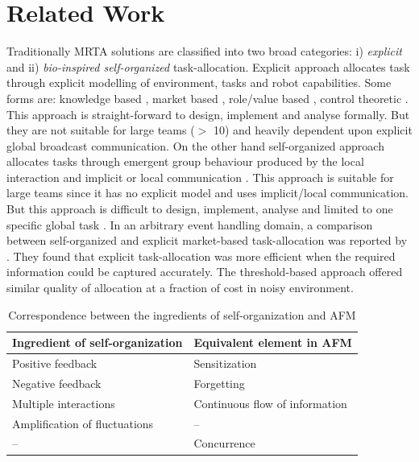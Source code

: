 \documentclass[smallcondensed]{svjour3}
\begin{document}
\section{Related Work}
\label{sec:rw}
Traditionally MRTA solutions are classified into two broad categories: i) {\em explicit} and ii) {\em bio-inspired self-organized} task-allocation.  Explicit approach allocates task through explicit modelling of environment, tasks and robot capabilities. Some forms are: knowledge based \citep{Parker1998}, market based \citep{Dias+2006}, role/value based \citep{Chaimowicz2002}, control theoretic \citep{Belta+2004}. This approach is straight-forward to design, implement and analyse formally. But they are not suitable for large teams ($>$ 10)  and heavily dependent upon explicit global broadcast communication.  On the other hand self-organized approach allocates tasks through emergent group behaviour produced by the local interaction and implicit or local communication \citep{Bonabeau+1999}. This approach is suitable for large teams since it has no explicit model and uses implicit/local communication. But this approach is difficult to design, implement, analyse and limited to one specific global task \citep{Gerkey+2004}. In an arbitrary event handling domain, a comparison between self-organized and explicit market-based task-allocation was reported by \citep{kalra+2007}. They found that explicit task-allocation was more efficient when the required information could be captured accurately. The threshold-based approach offered similar quality of allocation at a fraction of cost in noisy environment. 
\begin{table}
\label{table:so-afm}
\begin{center}
\begin{tabular}{|p{1in}|p{1in}|}
\hline  Ingredient of self-organization & Equivalent element in AFM \\ 
\hline Positive feedback &  Sensitization\\ 
\hline Negative feedback &  Forgetting\\ 
\hline Multiple interactions &  Continuous flow of information\\ 
\hline Amplification of fluctuations & -- \\ 
\hline  -- &  Concurrence\\ 
\hline 
\end{tabular} 
\caption{Correspondence between the ingredients of self-organization and AFM}
\end{center}
\end{table}
\end{document}
